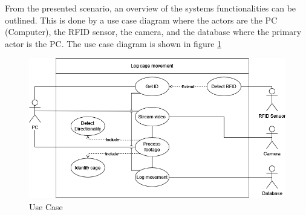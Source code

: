 From the presented scenario, an overview of the systems functionalities can be outlined. This is done by a use case diagram where the actors are the PC (Computer), the RFID sensor, the camera, and the database where the primary actor is the PC. The use case diagram is shown in figure \ref{fig:UseCase_CageMovement}

\begin{figure}[H]  %
	\centering
	\includegraphics[width=1\textwidth]{8Misc/Pictures/Introduction/Use case.png}
	\caption{Use Case}
	\label{fig:UseCase_CageMovement}
\end{figure}



            
                


